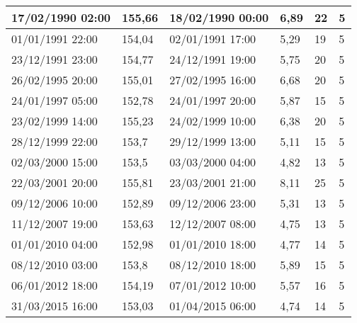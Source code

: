 \documentclass[11pt]{article}
\begin{document}
\begin{longtable}{|l|p{2.3cm}|l|p{2.3cm}|l|l|}
        17/02/1990 02:00 & 155,66 & 18/02/1990 00:00 & 6,89 & 22 & 5 \\ \hline
        01/01/1991 22:00 & 154,04 & 02/01/1991 17:00 & 5,29 & 19 & 5 \\ \hline
        23/12/1991 23:00 & 154,77 & 24/12/1991 19:00 & 5,75 & 20 & 5 \\ \hline
        26/02/1995 20:00 & 155,01 & 27/02/1995 16:00 & 6,68 & 20 & 5 \\ \hline
        24/01/1997 05:00 & 152,78 & 24/01/1997 20:00 & 5,87 & 15 & 5 \\ \hline
        23/02/1999 14:00 & 155,23 & 24/02/1999 10:00 & 6,38 & 20 & 5 \\ \hline
        28/12/1999 22:00 & 153,7 & 29/12/1999 13:00 & 5,11 & 15 & 5 \\ \hline
        02/03/2000 15:00 & 153,5 & 03/03/2000 04:00 & 4,82 & 13 & 5 \\ \hline
        22/03/2001 20:00 & 155,81 & 23/03/2001 21:00 & 8,11 & 25 & 5 \\ \hline
        09/12/2006 10:00 & 152,89 & 09/12/2006 23:00 & 5,31 & 13 & 5 \\ \hline
        11/12/2007 19:00 & 153,63 & 12/12/2007 08:00 & 4,75 & 13 & 5 \\ \hline
        01/01/2010 04:00 & 152,98 & 01/01/2010 18:00 & 4,77 & 14 & 5 \\ \hline
        08/12/2010 03:00 & 153,8 & 08/12/2010 18:00 & 5,89 & 15 & 5 \\ \hline
        06/01/2012 18:00 & 154,19 & 07/01/2012 10:00 & 5,57 & 16 & 5 \\ \hline
        31/03/2015 16:00 & 153,03 & 01/04/2015 06:00 & 4,74 & 14 & 5 \\ \hline

\end{longtable}


\FloatBarrier
\newpage
\printbibliography
\end{document}
